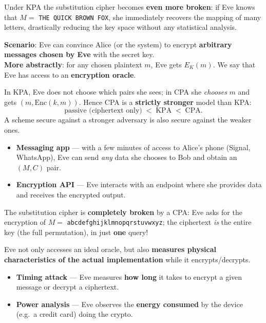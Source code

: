 \begin{exbox}[title=KPA and the substitution cipher]
Under KPA the substitution cipher becomes \textbf{even more broken}: if Eve knows that
$M = $ \texttt{THE QUICK BROWN FOX}, she immediately recovers the mapping of many
letters, drastically reducing the key space without any statistical analysis.
\end{exbox}

\begin{defnbox}[title=Chosen Plaintext Attack (CPA)]
\textbf{Scenario}: Eve can convince Alice (or the system) to encrypt \textbf{arbitrary
messages chosen by Eve} with the secret key. \\
\textbf{More abstractly}: for any chosen plaintext $m$, Eve gets $E_K(m)$. We say that
Eve has access to an \textbf{encryption oracle}.
\end{defnbox}

\begin{rembox}[title=KPA vs.\ CPA]
In KPA, Eve does not choose which pairs she sees; in CPA she \emph{chooses} $m$ and gets
$(m, \mathrm{Enc}(k, m))$. Hence CPA is a \textbf{strictly stronger} model than KPA:
\[
  \text{passive (ciphertext only)} \;<\; \text{KPA} \;<\; \text{CPA}.
\]
A scheme secure against a stronger adversary is also secure against the weaker ones.
\end{rembox}

\begin{propbox}[title=Why is CPA a realistic model?]
\begin{itemize}
  \item \textbf{Messaging app} --- with a few minutes of access to Alice's phone
        (Signal, WhatsApp), Eve can send \emph{any} data she chooses to Bob and obtain an
        $(M, C)$ pair.
  \item \textbf{Encryption API} --- Eve interacts with an endpoint where she provides
        data and receives the encrypted output.
\end{itemize}
\end{propbox}

\begin{exbox}[title=CPA and the substitution cipher]
The substitution cipher is \textbf{completely broken} by a CPA: Eve asks for the
encryption of $M = $ \texttt{abcdefghijklmnopqrstuvwxyz}; the ciphertext \emph{is} the
entire key (the full permutation), in just \textbf{one} query!
\end{exbox}

\begin{defnbox}[title=Side-channel attacks]
Eve not only accesses an ideal oracle, but also \textbf{measures physical
characteristics of the actual implementation} while it encrypts/decrypts.
\begin{itemize}
  \item \textbf{Timing attack} --- Eve measures \textbf{how long} it takes to encrypt a
        given message or decrypt a ciphertext.
  \item \textbf{Power analysis} --- Eve observes the \textbf{energy consumed} by the
        device (e.g.\ a credit card) doing the crypto.
\end{itemize}
\end{defnbox}

